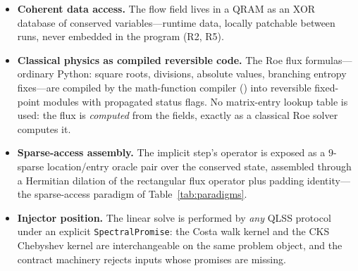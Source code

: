 \begin{itemize}
\item \textbf{Coherent data access.}  The flow field lives in a QRAM as an
  XOR database of conserved variables---runtime data, locally patchable
  between runs, never embedded in the program (R2, R5).
\item \textbf{Classical physics as compiled reversible code.}  The Roe flux
  formulas---ordinary Python: square roots, divisions, absolute values,
  branching entropy fixes---are compiled by the math-function compiler
  () into reversible fixed-point modules with
  propagated status flags.  No matrix-entry lookup table is used: the flux
  is \emph{computed} from the fields, exactly as a classical Roe solver
  computes it.
\item \textbf{Sparse-access assembly.}  The implicit step's operator is
  exposed as a $9$-sparse location/entry oracle pair over the conserved
  state, assembled through a Hermitian dilation of the rectangular flux
  operator plus padding identity---the sparse-access paradigm of
  Table~\ref{tab:paradigms}.
\item \textbf{Injector position.}  The linear solve is performed by
  \emph{any} QLSS protocol under an explicit \texttt{SpectralPromise}: the
  Costa walk kernel and the CKS Chebyshev kernel are interchangeable on the
  same problem object, and the contract machinery rejects inputs whose
  promises are missing.
\end{itemize}

